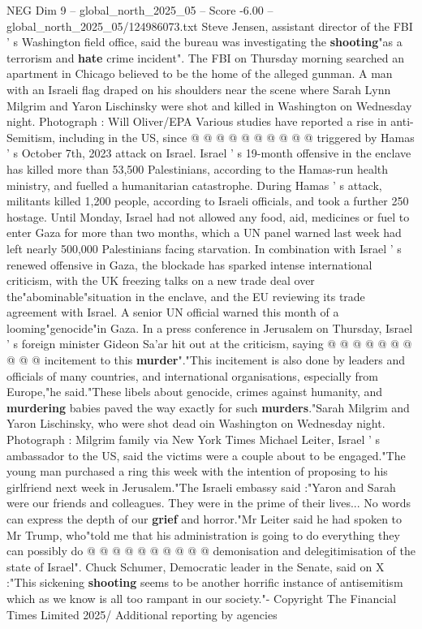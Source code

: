 \begin{textsample}{NEG Dim 9 – global\_north\_2025\_05 – Score -6.00 – global\_north\_2025\_05/124986073.txt}
Steve Jensen, assistant director of the FBI ' s Washington field office, said the bureau was investigating the \textbf{shooting}"as a terrorism and \textbf{hate} crime incident".
The FBI on Thursday morning searched an apartment in Chicago believed to be the home of the alleged gunman.
A man with an Israeli flag draped on his shoulders near the scene where Sarah Lynn Milgrim and Yaron Lischinsky were shot and killed in Washington on Wednesday night.
Photograph : Will Oliver/EPA Various studies have reported a rise in anti-Semitism, including in the US, since @ @ @ @ @ @ @ @ @ @ triggered by Hamas ' s October 7th, 2023 attack on Israel.
Israel ' s 19-month offensive in the enclave has killed more than 53,500 Palestinians, according to the Hamas-run health ministry, and fuelled a humanitarian catastrophe.
During Hamas ' s attack, militants killed 1,200 people, according to Israeli officials, and took a further 250 hostage.
Until Monday, Israel had not allowed any food, aid, medicines or fuel to enter Gaza for more than two months, which a UN panel warned last week had left nearly 500,000 Palestinians facing starvation.
In combination with Israel ' s renewed offensive in Gaza, the blockade has sparked intense international criticism, with the UK freezing talks on a new trade deal over the"abominable"situation in the enclave, and the EU reviewing its trade agreement with Israel.
A senior UN official warned this month of a looming"genocide"in Gaza.
In a press conference in Jerusalem on Thursday, Israel ' s foreign minister Gideon Sa'ar hit out at the criticism, saying @ @ @ @ @ @ @ @ @ @ incitement to this \textbf{murder}"."This incitement is also done by leaders and officials of many countries, and international organisations, especially from Europe,"he said."These libels about genocide, crimes against humanity, and \textbf{murdering} babies paved the way exactly for such \textbf{murders}."Sarah Milgrim and Yaron Lischinsky, who were shot dead oin Washington on Wednesday night.
Photograph : Milgrim family via New York Times Michael Leiter, Israel ' s ambassador to the US, said the victims were a couple about to be engaged."The young man purchased a ring this week with the intention of proposing to his girlfriend next week in Jerusalem."The Israeli embassy said :"Yaron and Sarah were our friends and colleagues.
They were in the prime of their lives...
No words can express the depth of our \textbf{grief} and horror."Mr Leiter said he had spoken to Mr Trump, who"told me that his administration is going to do everything they can possibly do @ @ @ @ @ @ @ @ @ @ demonisation and delegitimisation of the state of Israel".
Chuck Schumer, Democratic leader in the Senate, said on X :"This sickening \textbf{shooting} seems to be another horrific instance of antisemitism which as we know is all too rampant in our society."- Copyright The Financial Times Limited 2025/ Additional reporting by agencies

\end{textsample}
